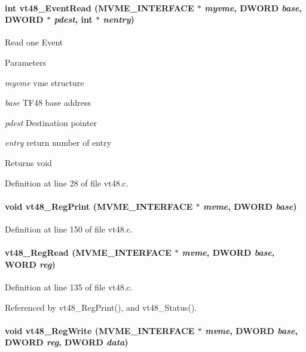 \paragraph[{vt48\_\-EventRead}]{\setlength{\rightskip}{0pt plus 5cm}int vt48\_\-EventRead ({\bf MVME\_\-INTERFACE} $\ast$ {\em myvme}, \/  {\bf DWORD} {\em base}, \/  {\bf DWORD} $\ast$ {\em pdest}, \/  int $\ast$ {\em nentry})}\hfill\label{vt48_8h_a1cefc6582d808ef387ecc7016d9577fa}
Read one Event 
\begin{DoxyParams}{Parameters}
\item[{\em myvme}]vme structure \item[{\em base}]TF48 base address \item[{\em pdest}]Destination pointer \item[{\em entry}]return number of entry \end{DoxyParams}
\begin{DoxyReturn}{Returns}
void 
\end{DoxyReturn}


Definition at line 28 of file vt48.c.
\paragraph[{vt48\_\-RegPrint}]{\setlength{\rightskip}{0pt plus 5cm}void vt48\_\-RegPrint ({\bf MVME\_\-INTERFACE} $\ast$ {\em mvme}, \/  {\bf DWORD} {\em base})}\hfill\label{vt48_8h_a0601108f279d6ef9ebb18ab81057f511}


Definition at line 150 of file vt48.c.
\paragraph[{vt48\_\-RegRead}]{ vt48\_\-RegRead ({\bf MVME\_\-INTERFACE} $\ast$ {\em mvme}, \/  {\bf DWORD} {\em base}, \/  {\bf WORD} {\em reg})}\hfill\label{vt48_8h_a8cc2c9b587fdf95193a9bc0758615524}


Definition at line 135 of file vt48.c.

Referenced by vt48\_\-RegPrint(), and vt48\_\-Status().
\paragraph[{vt48\_\-RegWrite}]{\setlength{\rightskip}{0pt plus 5cm}void vt48\_\-RegWrite ({\bf MVME\_\-INTERFACE} $\ast$ {\em mvme}, \/  {\bf DWORD} {\em base}, \/  {\bf DWORD} {\em reg}, \/  {\bf DWORD} {\em data})}\hfill\label{vt48_8h_aa8014da90c3ae3d4a191aa003d76078a}


